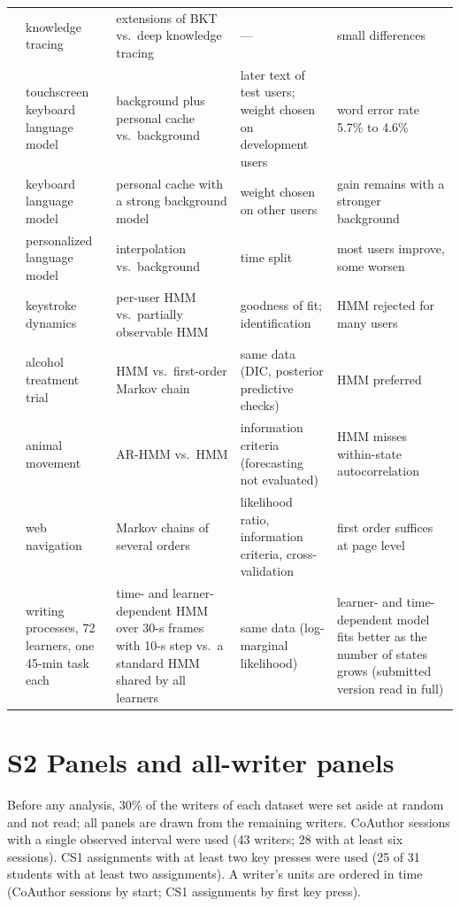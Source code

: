 \documentclass[10pt]{article}
\newcommand{\Ssec}[2]{\section*{S#1\texorpdfstring{\quad}{ } #2}\addcontentsline{toc}{section}{S#1\texorpdfstring{\quad}{ } #2}\label{S#1}}
\begin{document}
\begin{small}
\begin{longtable}{>{\raggedright}p{2.4cm}>{\raggedright}p{2.6cm}>{\raggedright}p{3.2cm}>{\raggedright}p{3.0cm}>{\raggedright\arraybackslash}p{3.6cm}}
\citet{Khajah2016} & knowledge tracing & extensions of BKT vs.\ deep knowledge tracing & --- & small differences \\
\citet{Fowler2015} & touchscreen keyboard language model & background plus personal cache vs.\ background & later text of test users; weight chosen on development users & word error rate 5.7\% to 4.6\% \\
\citet{Adhikary2023} & keyboard language model & personal cache with a strong background model & weight chosen on other users & gain remains with a stronger background \\
\citet{Shao2020} & personalized language model & interpolation vs.\ background & time split & most users improve, some worsen \\
\citet{Monaco2018} & keystroke dynamics & per-user HMM vs.\ partially observable HMM & goodness of fit; identification & HMM rejected for many users \\
\citet{Shirley2010} & alcohol treatment trial & HMM vs.\ first-order Markov chain & same data (DIC, posterior predictive checks) & HMM preferred \\
\citet{Stoye2025} & animal movement & AR-HMM vs.\ HMM & information criteria (forecasting not evaluated) & HMM misses within-state autocorrelation \\
\citet{Singer2014} & web navigation & Markov chains of several orders & likelihood ratio, information criteria, cross-validation & first order suffices at page level \\
\citet{Uto2020} & writing processes, 72 learners, one 45-min task each & time- and learner-dependent HMM over 30-s frames with 10-s step vs.\ a standard HMM shared by all learners & same data (log-marginal likelihood) & learner- and time-dependent model fits better as the number of states grows (submitted version read in full) \\
\bottomrule
\end{longtable}
\end{small}

\Ssec{2}{Panels and all-writer panels}

Before any analysis, 30\% of the writers of each dataset were set aside at random and not read; all panels are drawn from the remaining writers. CoAuthor sessions with a single observed interval were used (43 writers; 28 with at least six sessions). CS1 assignments with at least two key presses were used (25 of 31 students with at least two assignments). A writer's units are ordered in time (CoAuthor sessions by start; CS1 assignments by first key press).
\end{document}
